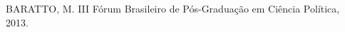 
%


\begin{cvcitems}
  \cvcitem
    {BARATTO, M.}
    {III Fórum Brasileiro de Pós-Graduação em Ciência Política, 2013.}
\end{cvcitems}
